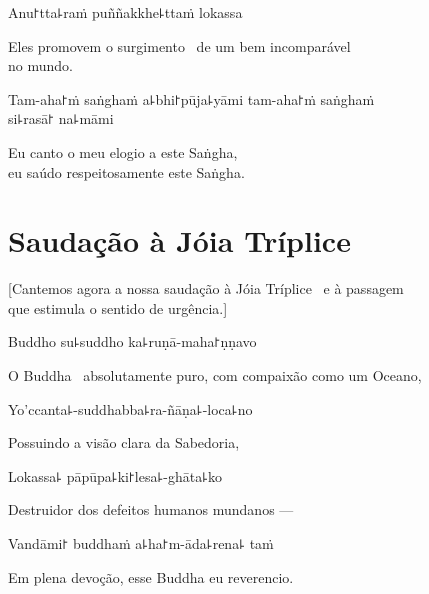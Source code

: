 Anu꜓tta꜕raṁ puññakkhe꜕ttaṁ lokassa

\begin{english}
  Eles promovem o surgimento \pause\ de um bem incomparável\\ no mundo.
\end{english}

Tam-aha꜓ṁ saṅghaṁ a꜕bhi꜓pūja꜕yāmi tam-aha꜓ṁ saṅghaṁ\\ si꜕rasā꜓ na꜕māmi

\begin{english}
  Eu canto o meu elogio a este Saṅgha,\\
  eu saúdo respeitosamente este Saṅgha.
\end{english}

\clearpage

\chapter{Saudação à Jóia Tríplice}

\begin{leader}
\end{leader}

\begin{english}
  [Cantemos agora a nossa saudação à Jóia Tríplice \pause\ e à passagem\\ que estimula o sentido de urgência.]
\end{english}

Buddho su꜕suddho ka꜕ruṇā-maha꜓ṇṇavo

\begin{english}
  O Buddha \pause\ absolutamente puro, com compaixão como um Oceano,
\end{english}

Yo'ccanta꜕-suddhabba꜕ra-ñāṇa꜕-loca꜕no

\begin{english}
 Possuindo a visão clara da Sabedoria,
\end{english}

Lokassa꜕ pāpūpa꜕ki꜓lesa꜕-ghāta꜕ko

\begin{english}
  Destruidor dos defeitos humanos mundanos ---
\end{english}

Vandāmi꜓ buddhaṁ a꜕ha꜓m-āda꜕rena꜕ taṁ

\begin{english}
  Em plena devoção, esse Buddha eu reverencio.
\end{english}

